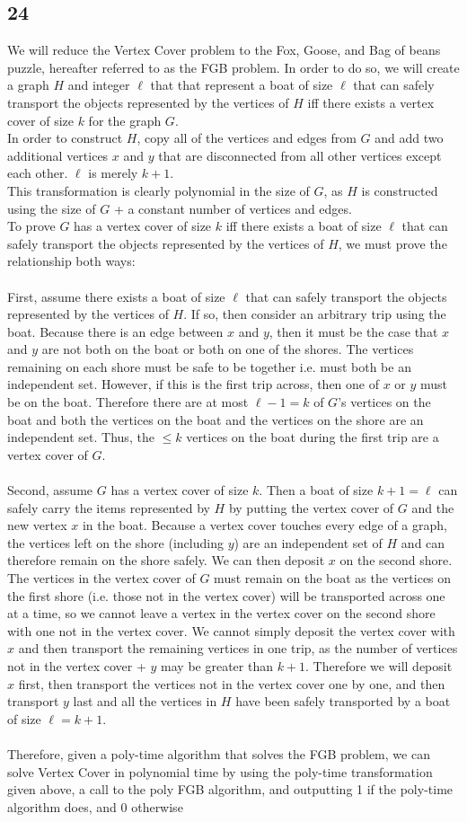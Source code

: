\documentclass[letterpaper,notitlepage,twoside]{article}
\begin{document}
\subsection*{24}
We will reduce the Vertex Cover problem to the Fox, Goose, and Bag of beans puzzle, hereafter referred to as the FGB problem. In order to do so, we will create a graph $H$ and integer $\ell$ that that represent a boat of size $\ell$ that can safely transport the objects represented by the vertices of $H$ iff there exists a vertex cover of size $k$ for the graph $G$. \\
In order to construct $H$, copy all of the vertices and edges from $G$ and add two additional vertices $x$ and $y$ that are disconnected from all other vertices except each other. $\ell$ is merely $k+1$. \\
This transformation is clearly polynomial in the size of $G$, as $H$ is constructed using the size of $G$ + a constant number of vertices and edges. \\
To prove $G$ has a vertex cover of size $k$ iff there exists a boat of size $\ell$ that can safely transport the objects represented by the vertices of $H$, we must prove the relationship both ways: \\\\
First, assume there exists a boat of size $\ell$ that can safely transport the objects represented by the vertices of $H$. If so, then consider an arbitrary trip using the boat. Because there is an edge between $x$ and $y$, then it must be the case that $x$ and $y$ are not both on the boat or both on one of the shores. The vertices remaining on each shore must be safe to be together i.e. must both be an independent set. However, if this is the first trip across, then one of $x$ or $y$ must be on the boat. Therefore there are at most $\ell - 1 = k$ of $G$'s vertices on the boat and both the vertices on the boat and the vertices on the shore are an independent set. Thus, the $\leq k$ vertices on the boat during the first trip are a vertex cover of $G$. \\\\
Second, assume $G$ has a vertex cover of size $k$. Then a boat of size $k+1=\ell$ can safely carry the items represented by $H$ by putting the vertex cover of $G$ and the new vertex $x$ in the boat. Because a vertex cover touches every edge of a graph, the vertices left on the shore (including $y$) are an independent set of $H$ and can therefore remain on the shore safely. We can then deposit $x$ on the second shore. The vertices in the vertex cover of $G$ must remain on the boat as the vertices on the first shore (i.e. those not in the vertex cover) will be transported across one at a time, so we cannot leave a vertex in the vertex cover on the second shore with one not in the vertex cover. We cannot simply deposit the vertex cover with $x$ and then transport the remaining vertices in one trip, as the number of vertices not in the vertex cover + $y$ may be greater than $k+1$. Therefore we will deposit $x$ first, then transport the vertices not in the vertex cover one by one, and then transport $y$ last and all the vertices in $H$ have been safely transported by a boat of size $\ell = k+1$.\\\\
Therefore, given a poly-time algorithm that solves the FGB problem, we can solve Vertex Cover in polynomial time by using the poly-time transformation given above, a call to the poly FGB algorithm, and outputting 1 if the poly-time algorithm does, and 0 otherwise
\end{document}
